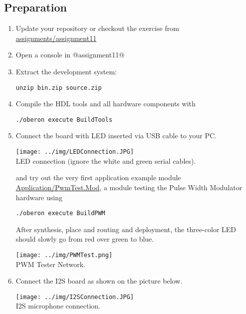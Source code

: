\documentclass[10pt, a4]{article}
\begin{document}
\subsection*{Preparation}
\begin{enumerate}
\item Update your repository or checkout the exercise from \href{https://svn.inf.ethz.ch/svn/lecturers/vorlesungen/trunk/syscon/2019/shared/assignments/assignment11}{assignments/assignment11}
\item Open a console in @assignment11@
\item Extract the development system:
\begin{lstlisting}[style=example]
unzip bin.zip source.zip
\end{lstlisting} 
\item Compile the HDL tools and all hardware components with
\begin{lstlisting}[style=example]
./oberon execute BuildTools
\end{lstlisting}
\item Connect the board with LED inserted via USB cable to your PC. 
\begin{center}
\texttt{[image: ../img/LEDConnection.JPG]}\\
\footnotesize  LED connection (ignore the white and green serial cables).
\end{center}

 and try out the very first application example module \href{\apath/Application/PwmTest.Mod}{Application/PwmTest.Mod}, a module testing the Pulse Width Modulator hardware using
\begin{lstlisting}[style=example]
./oberon execute BuildPWM
\end{lstlisting}
After synthesis, place and routing and deployment, the three-color LED should slowly go from red over green to blue.
\begin{center}
\texttt{[image: ../img/PWMTest.png]}\\
\footnotesize  PWM Tester Network.
\end{center}
\item Connect the I2S board as shown on the picture below.
\begin{center}
\texttt{[image: ../img/I2SConnection.JPG]}\\
\footnotesize  I2S microphone connection.
\end{center}

\end{enumerate}
\end{document}
